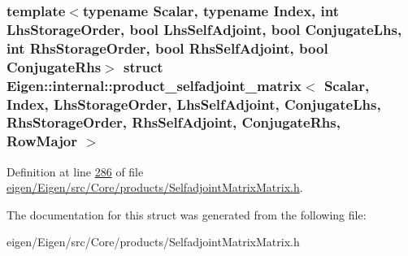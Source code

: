 \subsubsection*{template$<$typename Scalar, typename Index, int Lhs\+Storage\+Order, bool Lhs\+Self\+Adjoint, bool Conjugate\+Lhs, int Rhs\+Storage\+Order, bool Rhs\+Self\+Adjoint, bool Conjugate\+Rhs$>$\newline
struct Eigen\+::internal\+::product\+\_\+selfadjoint\+\_\+matrix$<$ Scalar, Index, Lhs\+Storage\+Order, Lhs\+Self\+Adjoint, Conjugate\+Lhs, Rhs\+Storage\+Order, Rhs\+Self\+Adjoint, Conjugate\+Rhs, Row\+Major $>$}



Definition at line \hyperlink{eigen_2_eigen_2src_2_core_2products_2_selfadjoint_matrix_matrix_8h_source_l00286}{286} of file \hyperlink{eigen_2_eigen_2src_2_core_2products_2_selfadjoint_matrix_matrix_8h_source}{eigen/\+Eigen/src/\+Core/products/\+Selfadjoint\+Matrix\+Matrix.\+h}.



The documentation for this struct was generated from the following file\+:\begin{DoxyCompactItemize}
\item 
eigen/\+Eigen/src/\+Core/products/\+Selfadjoint\+Matrix\+Matrix.\+h\end{DoxyCompactItemize}

